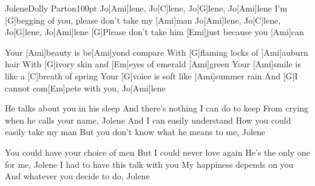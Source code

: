 \begin{song}{Jolene}{Dolly Parton}{100pt}
\chorus%
Jo[Ami]lene, Jo[C]lene, Jo[G]lene, Jo[Ami]lene
I'm [G]begging of you, please don't take my [Ami]man
Jo[Ami]lene, Jo[C]lene, Jo[G]lene, Jo[Ami]lene
[G]Please don't take him [Emi]just because you [Ami]can

%
Your [Ami]beauty is be[Ami]yond compare
With [G]flaming locks of [Ami]auburn hair
With [G]ivory skin and [Em]eyes of emerald [Ami]green
Your [Ami]smile is like a [C]breath of spring
Your [G]voice is soft like [Ami]summer rain
And [G]I cannot com[Em]pete with you, Jo[Ami]lene

%
He talks about you in his sleep
And there's nothing I can do to keep
From crying when he calls your name, Jolene
And I can easily understand
How you could easily take my man
But you don't know what he means to me, Jolene

\chorus

%
You could have your choice of men
But I could never love again
He's the only one for me, Jolene
I had to have this talk with you
My happiness depends on you
And whatever you decide to do, Jolene

\chorus
\end{song}
